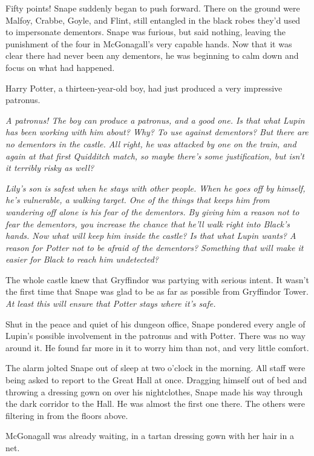 Fifty points! Snape suddenly began to push forward. There on the ground were Malfoy, Crabbe, Goyle, and Flint, still entangled in the black robes they'd used to impersonate dementors. Snape was furious, but said nothing, leaving the punishment of the four in McGonagall's very capable hands. Now that it was clear there had never been any dementors, he was beginning to calm down and focus on what had happened.

Harry Potter, a thirteen-year-old boy, had just produced a very impressive patronus.

\sbreak

\emph{A patronus! The boy can produce a patronus, and a good one. Is that what Lupin has been working with him about? Why? To use against dementors? But there are no dementors in the castle. All right, he was attacked by one on the train, and again at that first Quidditch match, so maybe there's some justification, but isn't it terribly risky as well?}

\emph{Lily's son is safest when he stays with other people. When he goes off by himself, he's vulnerable, a walking target. One of the things that keeps him from wandering off alone is his fear of the dementors. By giving him a reason not to fear the dementors, you increase the chance that he'll walk right into Black's hands. Now what will keep him inside the castle? Is that what Lupin wants? A reason for Potter not to be afraid of the dementors? Something that will make it easier for Black to reach him undetected?}

The whole castle knew that Gryffindor was partying with serious intent. It wasn't the first time that Snape was glad to be as far as possible from Gryffindor Tower. \emph{At least this will ensure that Potter stays where it's safe.}

Shut in the peace and quiet of his dungeon office, Snape pondered every angle of Lupin's possible involvement in the patronus and with Potter. There was no way around it. He found far more in it to worry him than not, and very little comfort.

The alarm jolted Snape out of sleep at two o'clock in the morning. All staff were being asked to report to the Great Hall at once. Dragging himself out of bed and throwing a dressing gown on over his nightclothes, Snape made his way through the dark corridor to the Hall. He was almost the first one there. The others were filtering in from the floors above.

McGonagall was already waiting, in a tartan dressing gown with her hair in a net.

